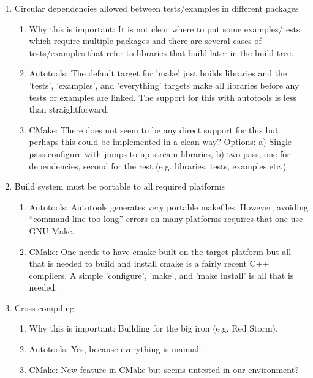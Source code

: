 \documentclass[pdf,ps2pdf,11pt]{SANDreport}
\begin{document}
\begin{enumerate}
{}\item Circular dependencies allowed between tests/examples in
different packages

  \begin{enumerate}

  {}\item Why this is important: It is not clear where to put some
  examples/tests which require multiple packages and there are
  several cases of tests/examples that refer to libraries that build
  later in the build tree.

  {}\item Autotools: The default target for 'make' just builds
  libraries and the 'tests', 'examples', and 'everything' targets
  make all libraries before any tests or examples are linked.  The
  support for this with autotools is less than straightforward.

  {}\item CMake: There does not seem to be any direct support for
  this but perhaps this could be implemented in a clean way? 
  Options: a) Single pass configure with jumps to up-stream
  libraries, b) two pass, one for dependencies, second for the rest
  (e.g. libraries, tests, examples etc.)

  \end{enumerate}

{}\item Build system must be portable to all required platforms

  \begin{enumerate}

  {}\item Autotools: Autotools generates very portable makefiles.
  However, avoiding ``command-line too long'' errors on many
  platforms requires that one use GNU Make.

  {}\item CMake: One needs to have cmake built on the target
  platform but all that is needed to build and install cmake is a
  fairly recent C++ compilers.  A simple 'configure', 'make', and
  'make install' is all that is needed. 

  \end{enumerate}

{}\item Cross compiling

  \begin{enumerate}

  {}\item Why this is important: Building for the big iron (e.g. Red Storm).

  {}\item Autotools: Yes, because everything is manual.

  {}\item CMake: New feature in CMake but seems untested in our
  environment?

  \end{enumerate}

\end{enumerate}
\end{document}
